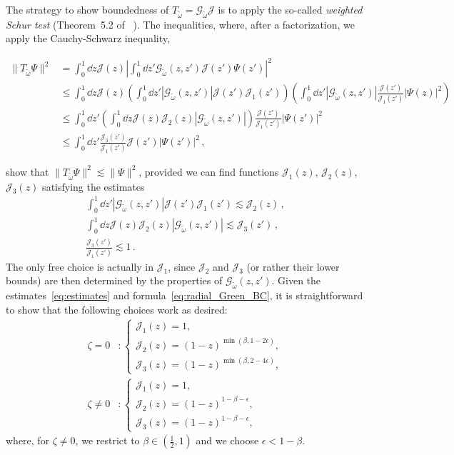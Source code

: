 \documentclass[aps, prd, amsmath, floats, floatfix, twocolumn, nofootinbib, superscriptaddress, showpacs]{revtex4-1}
\def\cG{\mathcal{G}}
\def\cJ{\mathcal{J}}
\def\tomega{{\tilde{\omega}}}
\begin{document}
The strategy to show boundedness of $T_\tomega = \cG_\tomega \cJ$ is to
apply the so-called \emph{weighted Schur test} (Theorem~5.2 of ~\cite{halmos}).
The inequalities, where, after a factorization, we apply the
Cauchy-Schwarz inequality,
\begin{widetext}
	\begin{align*}
	\|T_\tomega\Psi\|^2
	&= \int_0^1\dd{z} \cJ(z) \left|\int_0^1 \dd{z'} \cG_\tomega(z,z') \cJ(z') \Psi(z') \right|^2 \\
	&\leqslant \int_0^1\dd{z} \cJ(z)
	\left(\int_0^1\dd{z'} \left|\cG_\tomega(z,z')\right| \cJ(z') \cJ_1(z') \right)
	\left(\int_0^1\dd{z'}
	\left|\cG_\tomega(z,z')\right| \frac{\cJ(z')}{\cJ_1(z')}
	\left|\Psi(z)\right|^2 \right) 
	\\
	&\leqslant \int_0^1\dd{z'}
	\left(\int_0^1\dd{z} \cJ(z) \cJ_2(z) \left|\cG_\tomega(z,z')\right|\right)
	\frac{\cJ(z')}{\cJ_1(z')} \left|\Psi(z')\right|^2
	\\ 	
	&\leqslant \int_0^1\dd{z'} \frac{\cJ_3(z')}{\cJ_1(z')}
	\cJ(z') \left|\Psi(z')\right|^2 \, ,
	\end{align*}
\end{widetext}
show that $\|T_\tomega \Psi\|^2 \lesssim \|\Psi\|^2$, provided we can
find functions $\cJ_1(z)$, $\cJ_2(z)$, $\cJ_3(z)$ satisfying the
estimates
\begin{gather*}
\int_0^1 \dd{z'} \left|\cG_\tomega(z,z')\right| \cJ(z') \cJ_1(z')
\lesssim \cJ_2(z) \, , \\
\int_0^1 \dd{z} \cJ(z) \cJ_2(z) \left|\cG_\tomega(z,z')\right|
\lesssim \cJ_3(z') \, , \\
\frac{\cJ_3(z')}{\cJ_1(z')}
\lesssim 1 \, .
\end{gather*}
The only free choice is actually in $\cJ_1$, since $\cJ_2$ and $\cJ_3$
(or rather their lower bounds) are then determined by the properties of
$\cG_\tomega(z,z')$. Given the estimates~\eqref{eq:estimates} and
formula~\eqref{eq:radial_Green_BC}, it is straightforward to show that the
following choices work as desired:
\begin{align}
\zeta=0 &\colon
\begin{cases}
\cJ_1(z) = 1 , \\
\cJ_2(z) = (1-z)^{\min(\beta,1-2\epsilon)} , \\
\cJ_3(z) = (1-z)^{\min(\beta,2-4\epsilon)} ,
\end{cases}
\\
\zeta\ne0 &\colon
\begin{cases}
\cJ_1(z) = 1 , \\
\cJ_2(z) = (1-z)^{1-\beta-\epsilon} , \\
\cJ_3(z) = (1-z)^{1-\beta-\epsilon} ,
\end{cases}
\end{align}
where, for $\zeta\ne0$, we restrict to $\beta \in
(\frac{1}{2}, 1)$ and we choose $\epsilon < 1-\beta$.
\end{document}
